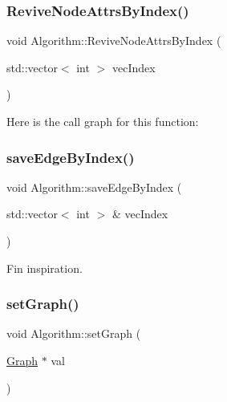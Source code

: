 \subsubsection{\texorpdfstring{Revive\+Node\+Attrs\+By\+Index()}{ReviveNodeAttrsByIndex()}}
{\footnotesize\ttfamily void Algorithm\+::\+Revive\+Node\+Attrs\+By\+Index (\begin{DoxyParamCaption}\item[{std\+::vector$<$ int $>$}]{vec\+Index }\end{DoxyParamCaption})}

Here is the call graph for this function\+:
\mbox{\label{struct_algorithm_a946680d5d61db2c1f71ee80f95e6436e}} 
\subsubsection{\texorpdfstring{save\+Edge\+By\+Index()}{saveEdgeByIndex()}}
{\footnotesize\ttfamily void Algorithm\+::save\+Edge\+By\+Index (\begin{DoxyParamCaption}\item[{std\+::vector$<$ int $>$ \&}]{vec\+Index }\end{DoxyParamCaption})}



Fin inspiration. 

\mbox{\label{struct_algorithm_aa02d10ce76cebfcb8dbca2596181d196}} 
\subsubsection{\texorpdfstring{set\+Graph()}{setGraph()}}
{\footnotesize\ttfamily void Algorithm\+::set\+Graph (\begin{DoxyParamCaption}\item[{\mbox{\hyperlink{class_graph}{Graph}} $\ast$}]{val }\end{DoxyParamCaption})\hspace{0.3cm}{\ttfamily [inline]}}

\mbox{\label{struct_algorithm_a7ada217d91dc5b83c84c851ec4441433}} 

